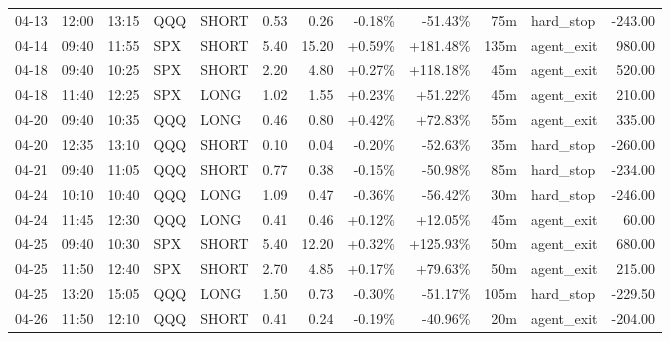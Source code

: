\documentclass[11pt,a4paper,twoside]{article}
\begin{document}
\begin{center}
\begin{longtable}{>{\color{txtmain}}l l l l l r r r r r >{\color{txtmain}}l r}
04-13 & 12:00 & 13:15 & QQQ & SHORT & 0.53 & 0.26 & \textcolor{lossred}{-0.18\%} & \textcolor{lossred}{-51.43\%} & 75m & hard\_stop & \textcolor{lossred}{-243.00} \\
04-14 & 09:40 & 11:55 & SPX & SHORT & 5.40 & 15.20 & \textcolor{wingreen}{+0.59\%} & \textcolor{wingreen}{+181.48\%} & 135m & agent\_exit & \textcolor{wingreen}{980.00} \\
04-18 & 09:40 & 10:25 & SPX & SHORT & 2.20 & 4.80 & \textcolor{wingreen}{+0.27\%} & \textcolor{wingreen}{+118.18\%} & 45m & agent\_exit & \textcolor{wingreen}{520.00} \\
04-18 & 11:40 & 12:25 & SPX & LONG & 1.02 & 1.55 & \textcolor{wingreen}{+0.23\%} & \textcolor{wingreen}{+51.22\%} & 45m & agent\_exit & \textcolor{wingreen}{210.00} \\
04-20 & 09:40 & 10:35 & QQQ & LONG & 0.46 & 0.80 & \textcolor{wingreen}{+0.42\%} & \textcolor{wingreen}{+72.83\%} & 55m & agent\_exit & \textcolor{wingreen}{335.00} \\
04-20 & 12:35 & 13:10 & QQQ & SHORT & 0.10 & 0.04 & \textcolor{lossred}{-0.20\%} & \textcolor{lossred}{-52.63\%} & 35m & hard\_stop & \textcolor{lossred}{-260.00} \\
04-21 & 09:40 & 11:05 & QQQ & SHORT & 0.77 & 0.38 & \textcolor{lossred}{-0.15\%} & \textcolor{lossred}{-50.98\%} & 85m & hard\_stop & \textcolor{lossred}{-234.00} \\
04-24 & 10:10 & 10:40 & QQQ & LONG & 1.09 & 0.47 & \textcolor{lossred}{-0.36\%} & \textcolor{lossred}{-56.42\%} & 30m & hard\_stop & \textcolor{lossred}{-246.00} \\
04-24 & 11:45 & 12:30 & QQQ & LONG & 0.41 & 0.46 & \textcolor{wingreen}{+0.12\%} & \textcolor{wingreen}{+12.05\%} & 45m & agent\_exit & \textcolor{wingreen}{60.00} \\
04-25 & 09:40 & 10:30 & SPX & SHORT & 5.40 & 12.20 & \textcolor{wingreen}{+0.32\%} & \textcolor{wingreen}{+125.93\%} & 50m & agent\_exit & \textcolor{wingreen}{680.00} \\
04-25 & 11:50 & 12:40 & SPX & SHORT & 2.70 & 4.85 & \textcolor{wingreen}{+0.17\%} & \textcolor{wingreen}{+79.63\%} & 50m & agent\_exit & \textcolor{wingreen}{215.00} \\
04-25 & 13:20 & 15:05 & QQQ & LONG & 1.50 & 0.73 & \textcolor{lossred}{-0.30\%} & \textcolor{lossred}{-51.17\%} & 105m & hard\_stop & \textcolor{lossred}{-229.50} \\
04-26 & 11:50 & 12:10 & QQQ & SHORT & 0.41 & 0.24 & \textcolor{lossred}{-0.19\%} & \textcolor{lossred}{-40.96\%} & 20m & agent\_exit & \textcolor{lossred}{-204.00} \\

\end{longtable}
\end{center}
\end{document}
